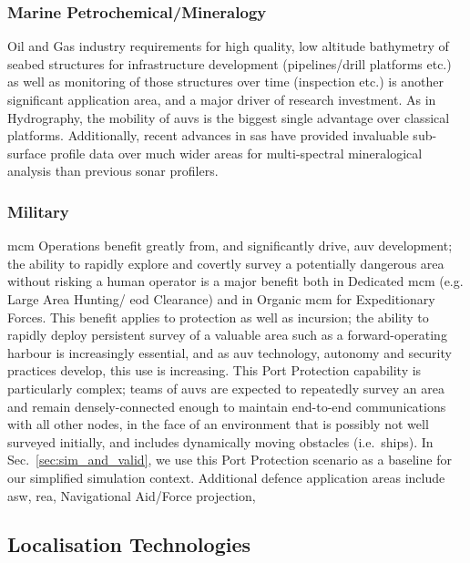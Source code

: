 \subsubsection{Marine Petrochemical/Mineralogy}
Oil and Gas industry requirements for high quality, low altitude bathymetry of seabed structures for infrastructure development (pipelines/drill platforms etc.) as well as monitoring of those structures over time (inspection etc.) is another significant application area, and a major driver of research investment.
As in Hydrography, the mobility of \glspl{auv} is the biggest single advantage over classical platforms\cite{Morr2003}.
Additionally, recent advances in \gls{sas} have provided invaluable sub-surface profile data over much wider areas for multi-spectral mineralogical analysis than previous sonar profilers\cite{Denny2015}.

\subsubsection{Military}
\gls{mcm} Operations benefit greatly from, and significantly drive, \gls{auv} development; the ability to rapidly explore and covertly survey a potentially dangerous area without risking a human operator is a major benefit both in Dedicated \gls{mcm} (e.g. Large Area Hunting/ \gls{eod} Clearance) and in Organic \gls{mcm} for Expeditionary Forces.
This benefit applies to protection as well as incursion; the ability to rapidly deploy persistent survey of a valuable area such as a forward-operating harbour is increasingly essential, and as \gls{auv} technology, autonomy and security practices develop, this use is increasing.
This Port Protection capability is particularly complex;  teams of \glspl{auv} are expected to repeatedly survey an area and remain densely-connected enough to maintain end-to-end communications with all other nodes, in the face of an environment that is possibly not well surveyed initially, and includes dynamically moving obstacles (i.e.\ ships).
In Sec.~\ref{sec:sim_and_valid}, we use this Port Protection scenario as a baseline for our simplified simulation context.
Additional defence application areas include \gls{asw}, \gls{rea}, Navigational Aid/Force projection, 



\subsection{Localisation Technologies}


